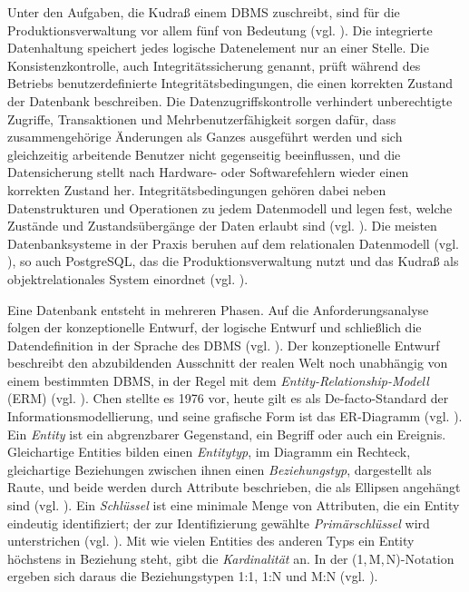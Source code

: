 Unter den Aufgaben, die Kudraß einem DBMS zuschreibt, sind für die
Produktionsverwaltung vor allem fünf von Bedeutung (vgl.
\cite[S.~23\,f.]{kudrassDatenbankenGrundlagenUnd2015}). Die integrierte
Datenhaltung speichert jedes logische Datenelement nur an einer Stelle. Die
Konsistenzkontrolle, auch Integritätssicherung genannt, prüft während des
Betriebs benutzerdefinierte Integritätsbedingungen, die einen korrekten Zustand
der Datenbank beschreiben. Die Datenzugriffskontrolle verhindert unberechtigte
Zugriffe, Transaktionen und Mehrbenutzerfähigkeit sorgen dafür, dass
zusammengehörige Änderungen als Ganzes ausgeführt werden und sich gleichzeitig
arbeitende Benutzer nicht gegenseitig beeinflussen, und die Datensicherung
stellt nach Hardware- oder Softwarefehlern wieder einen korrekten Zustand her.
Integritätsbedingungen gehören dabei neben Datenstrukturen und Operationen zu
jedem Datenmodell und legen fest, welche Zustände und Zustandsübergänge der
Daten erlaubt sind (vgl. \cite[S.~21]{kudrassDatenbankenGrundlagenUnd2015}).
Die meisten Datenbanksysteme in der Praxis beruhen auf dem relationalen
Datenmodell (vgl. \cite[S.~22]{kudrassDatenbankenGrundlagenUnd2015}), so auch
PostgreSQL, das die Produktionsverwaltung nutzt und das Kudraß als
objektrelationales System einordnet (vgl.
\cite[S.~26]{kudrassDatenbankenGrundlagenUnd2015}).

Eine Datenbank entsteht in mehreren Phasen. Auf die Anforderungsanalyse folgen
der konzeptionelle Entwurf, der logische Entwurf und schließlich die
Datendefinition in der Sprache des DBMS (vgl.
\cite[S.~44\,f.]{kudrassTaschenbuchInformationsmodellierung}). Der
konzeptionelle Entwurf beschreibt den abzubildenden Ausschnitt der realen Welt
noch unabhängig von einem bestimmten DBMS, in der Regel mit dem
\emph{Entity-Relationship-Modell} (ERM) (vgl.
\cite[S.~46]{kudrassTaschenbuchInformationsmodellierung}). Chen stellte es 1976
vor, heute gilt es als De-facto-Standard der Informationsmodellierung, und
seine grafische Form ist das ER-Diagramm (vgl.
\cite[S.~49\,f.]{kudrassTaschenbuchInformationsmodellierung}). Ein
\emph{Entity} ist ein abgrenzbarer Gegenstand, ein Begriff oder auch ein
Ereignis. Gleichartige Entities bilden einen \emph{Entitytyp}, im Diagramm ein
Rechteck, gleichartige Beziehungen zwischen ihnen einen \emph{Beziehungstyp},
dargestellt als Raute, und beide werden durch Attribute beschrieben, die als
Ellipsen angehängt sind (vgl.
\cite[S.~51--53]{kudrassTaschenbuchInformationsmodellierung}). Ein
\emph{Schlüssel} ist eine minimale Menge von Attributen, die ein Entity
eindeutig identifiziert; der zur Identifizierung gewählte
\emph{Primärschlüssel} wird unterstrichen (vgl.
\cite[S.~58]{kudrassTaschenbuchInformationsmodellierung}). Mit wie vielen
Entities des anderen Typs ein Entity höchstens in Beziehung steht, gibt die
\emph{Kardinalität} an. In der (1,\,M,\,N)-Notation ergeben sich daraus die
Beziehungstypen 1:1, 1:N und M:N (vgl.
\cite[S.~54]{kudrassTaschenbuchInformationsmodellierung}).

